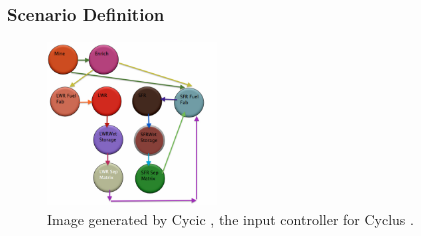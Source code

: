 \begin{frame}[fragile]
  \frametitle{Scenario Definition}
\begin{figure}[htpb]
\begin{center}
\includegraphics[width=0.4\textwidth]{cycic_img.eps}
\end{center}
\caption{Image generated by Cycic
\cite{flanagan_input_2013}
, the input controller for Cyclus
\cite{carlsen_cyclus_2014}.} 
\label{fig:cycic_img}
\end{figure}
\end{frame}
